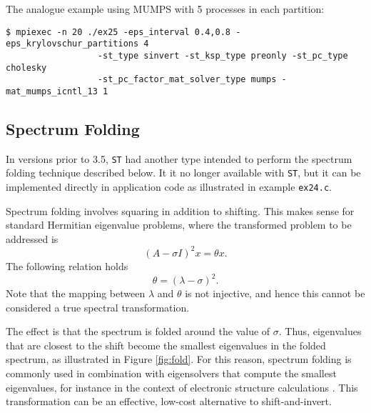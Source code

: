 The analogue example using MUMPS with 5 processes in each partition:
\begin{Verbatim}[fontsize=\small]
	$ mpiexec -n 20 ./ex25 -eps_interval 0.4,0.8 -eps_krylovschur_partitions 4
                  -st_type sinvert -st_ksp_type preonly -st_pc_type cholesky
                  -st_pc_factor_mat_solver_type mumps -mat_mumps_icntl_13 1
\end{Verbatim}

\subsection{Spectrum Folding}

In \slepc versions prior to 3.5, \texttt{ST} had another type intended to perform the spectrum folding technique described below. It it no longer available with \texttt{ST}, but it can be implemented directly in application code as illustrated in example \texttt{ex24.c}.

Spectrum folding involves squaring in addition to shifting. This makes sense for standard Hermitian eigenvalue problems, where the transformed problem to be addressed is
\begin{equation}(A-\sigma I)^2x=\theta x.\end{equation}
The following relation holds
\begin{equation}\theta=(\lambda-\sigma)^2.\end{equation}
Note that the mapping between $\lambda$ and $\theta$ is not injective, and hence this cannot be considered a true spectral transformation.

The effect is that the spectrum is folded around the value of $\sigma$. Thus, eigenvalues that are closest to the shift become the smallest eigenvalues in the folded spectrum, as illustrated in Figure \ref{fig:fold}. For this reason, spectrum folding is commonly used in combination with eigensolvers that compute the smallest eigenvalues, for instance in the context of electronic structure calculations \citep{Canning:2000:PEP}. This transformation can be an effective, low-cost alternative to shift-and-invert.

